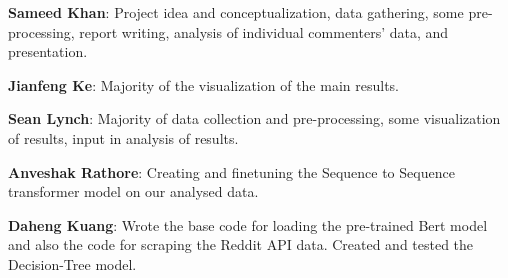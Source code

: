\documentclass{article}
\begin{document}
\textbf{Sameed Khan}: Project idea and conceptualization, data gathering, some pre-processing, report writing, analysis of individual commenters' data, and presentation.

\noindent\textbf{Jianfeng Ke}: Majority of the visualization of the main results.

\noindent\textbf{Sean Lynch}: Majority of data collection and pre-processing, some visualization of results, input in analysis of results.

\noindent\textbf{Anveshak Rathore}: Creating and finetuning the Sequence to Sequence transformer model on our analysed data. 

\noindent\textbf{Daheng Kuang}: Wrote the base code for loading the pre-trained Bert model and also the code for scraping the Reddit API data. Created and tested the Decision-Tree model. 



\end{document}
